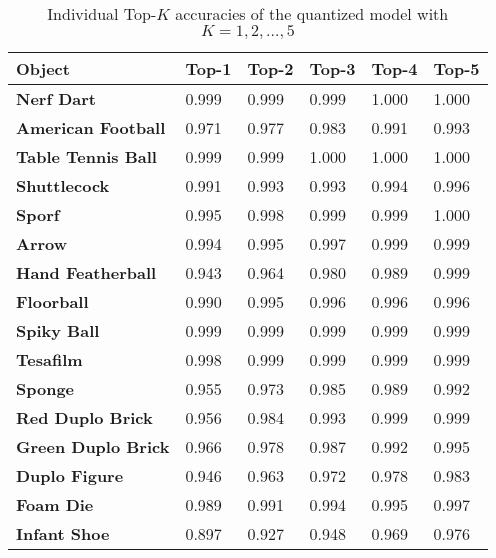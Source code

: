 \begin{table}
  \caption{Individual Top-$K$ accuracies of the quantized model with $K = 1, 2, \dots, 5$}
  \label{tab:individual_top_k_inference}
  \centering
  \begin{tabular}{llllll}
    \toprule
    \textbf{Object} & \textbf{Top-1} & \textbf{Top-2} & \textbf{Top-3} & \textbf{Top-4} & \textbf{Top-5} \\
    \midrule
    \textbf{Nerf Dart} & \num{0.999} & \num{0.999} & \num{0.999} & \num{1.000} & \num{1.000} \\
    \textbf{American Football} & \num{0.971} & \num{0.977} & \num{0.983} & \num{0.991} & \num{0.993} \\
    \textbf{Table Tennis Ball} & \num{0.999} & \num{0.999} & \num{1.000} & \num{1.000} & \num{1.000} \\
    \textbf{Shuttlecock} & \num{0.991} & \num{0.993} & \num{0.993} & \num{0.994} & \num{0.996} \\
    \textbf{Sporf} & \num{0.995} & \num{0.998} & \num{0.999} & \num{0.999} & \num{1.000} \\
    \textbf{Arrow} & \num{0.994} & \num{0.995} & \num{0.997} & \num{0.999} & \num{0.999} \\
    \textbf{Hand Featherball} & \num{0.943} & \num{0.964} & \num{0.980} & \num{0.989} & \num{0.999} \\
    \textbf{Floorball} & \num{0.990} & \num{0.995} & \num{0.996} & \num{0.996} & \num{0.996} \\
    \textbf{Spiky Ball} & \num{0.999} & \num{0.999} & \num{0.999} & \num{0.999} & \num{0.999} \\
    \textbf{Tesafilm} & \num{0.998} & \num{0.999} & \num{0.999} & \num{0.999} & \num{0.999} \\
    \textbf{Sponge} & \num{0.955} & \num{0.973} & \num{0.985} & \num{0.989} & \num{0.992} \\
    \textbf{Red Duplo Brick} & \num{0.956} & \num{0.984} & \num{0.993} & \num{0.999} & \num{0.999} \\
    \textbf{Green Duplo Brick} & \num{0.966} & \num{0.978} & \num{0.987} & \num{0.992} & \num{0.995} \\
    \textbf{Duplo Figure} & \num{0.946} & \num{0.963} & \num{0.972} & \num{0.978} & \num{0.983} \\
    \textbf{Foam Die} & \num{0.989} & \num{0.991} & \num{0.994} & \num{0.995} & \num{0.997} \\
    \textbf{Infant Shoe} & \num{0.897} & \num{0.927} & \num{0.948} & \num{0.969} & \num{0.976} \\

\end{tabular}
\end{table}
